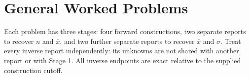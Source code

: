 \section{General Worked Problems}\label{sec:general-worked}
\label{sec:worked-solution-examples}
\par\vspace{5mm}
Each problem has three stages: four forward constructions, two separate reports to recover
$n$ and $\bar x$, and two further separate reports to recover $\bar x$ and $\sigma$.
Treat every inverse report independently: its unknowns are not shared with another report
or with Stage 1. All inverse endpoints are exact relative to the supplied construction cutoff.

